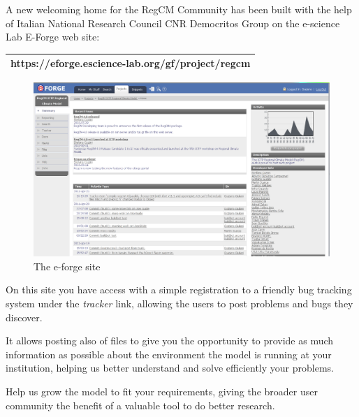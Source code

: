 %
%

A new welcoming home for the RegCM Community has been built with the help
of Italian National Research Council CNR Democritos Group on the e-science
Lab E-Forge web site:

\vspace{0.5cm}
\begin{tabular}{|c|}
\hline
{\bf https://eforge.escience-lab.org/gf/project/regcm} \\
\hline
\end{tabular}
\vspace{0.5cm}

\begin{figure}[h!]
\caption{The e-forge site}
\centering
\includegraphics[width=12cm]{e-forge}
\end{figure}

On this site you have access with a simple registration to a friendly
bug tracking system under the {\em tracker} link, allowing the users to
post problems and bugs they discover.

It allows posting also of files to give you the opportunity to provide as
much information as possible about the environment the model is running at
your institution, helping us better understand and solve efficiently your
problems.

Help us grow the model to fit your requirements, giving the broader user
community the benefit of a valuable tool to do better research.

